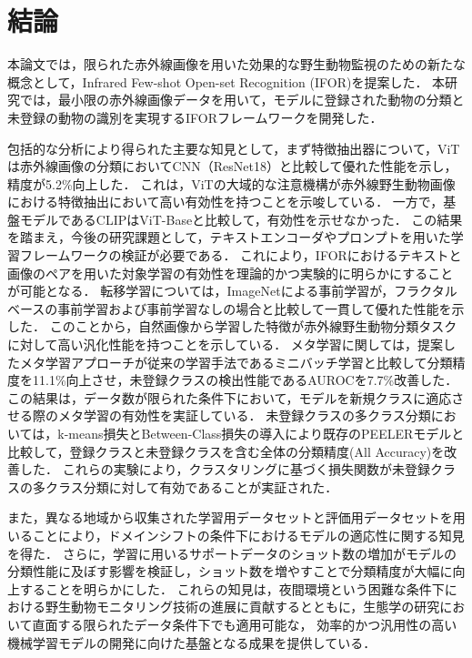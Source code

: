 \documentclass[a4paper,11pt,nomag]{jsreport}
\begin{document}
\setcounter{chapter}{5}

\chapter*{結論}

本論文では，限られた赤外線画像を用いた効果的な野生動物監視のための新たな概念として，Infrared Few-shot Open-set Recognition (IFOR)を提案した．
本研究では，最小限の赤外線画像データを用いて，モデルに登録された動物の分類と未登録の動物の識別を実現するIFORフレームワークを開発した．

包括的な分析により得られた主要な知見として，まず特徴抽出器について，ViTは赤外線画像の分類においてCNN（ResNet18）と比較して優れた性能を示し，精度が5.2\%向上した．
これは，ViTの大域的な注意機構が赤外線野生動物画像における特徴抽出において高い有効性を持つことを示唆している．
一方で，基盤モデルであるCLIPはViT-Baseと比較して，有効性を示せなかった．
この結果を踏まえ，今後の研究課題として，テキストエンコーダやプロンプトを用いた学習フレームワークの検証が必要である．
これにより，IFORにおけるテキストと画像のペアを用いた対象学習の有効性を理論的かつ実験的に明らかにすることが可能となる．
転移学習については，ImageNetによる事前学習が，フラクタルベースの事前学習および事前学習なしの場合と比較して一貫して優れた性能を示した．
このことから，自然画像から学習した特徴が赤外線野生動物分類タスクに対して高い汎化性能を持つことを示している．
メタ学習に関しては，提案したメタ学習アプローチが従来の学習手法であるミニバッチ学習と比較して分類精度を11.1\%向上させ，未登録クラスの検出性能であるAUROCを7.7\%改善した．
この結果は，データ数が限られた条件下において，モデルを新規クラスに適応させる際のメタ学習の有効性を実証している．
未登録クラスの多クラス分類においては，k-means損失とBetween-Class損失の導入により既存のPEELERモデルと比較して，登録クラスと未登録クラスを含む全体の分類精度(All Accuracy)を改善した．
これらの実験により，クラスタリングに基づく損失関数が未登録クラスの多クラス分類に対して有効であることが実証された．

また，異なる地域から収集された学習用データセットと評価用データセットを用いることにより，ドメインシフトの条件下におけるモデルの適応性に関する知見を得た．
さらに，学習に用いるサポートデータのショット数の増加がモデルの分類性能に及ぼす影響を検証し，ショット数を増やすことで分類精度が大幅に向上することを明らかにした．
これらの知見は，夜間環境という困難な条件下における野生動物モニタリング技術の進展に貢献するとともに，生態学の研究において直面する限られたデータ条件下でも適用可能な，
効率的かつ汎用性の高い機械学習モデルの開発に向けた基盤となる成果を提供している．
\end{document}
